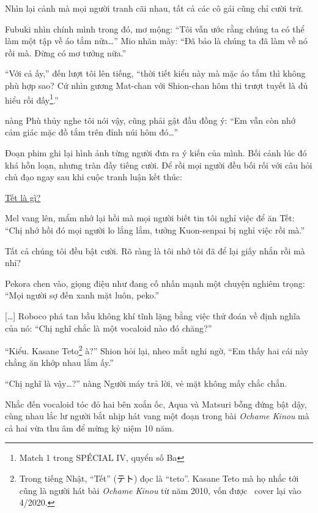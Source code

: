 \documentclass[../main.tex]{subfiles}
\begin{document}
\il

Nhìn lại cảnh mà mọi người tranh cãi nhau, tất cả các cô gái cũng chỉ cười trừ.

Fubuki nhìn chính mình trong đó, mơ mộng: ``Tôi vẫn ước rằng chúng ta có thể làm một tập về áo tắm nữa\dots'' Mio nhăn mày: ``Đã bảo là chúng ta đã làm về nó rồi mà. Đừng có mơ tưởng nữa.''

``Với cả ấy,'' đến lượt tôi lên tiếng, ``thời tiết kiểu này mà mặc áo tắm thì không phù hợp sao? Cứ nhìn gương Mat-chan với Shion-chan hôm thi trượt tuyết là đủ hiểu rồi đấy\footnote{{\sen Match 1} trong {\flaregothic SPÉCIAL IV}, quyển số Ba}.''

nàng Phù thủy nghe tôi nói vậy, cũng phải gật đầu đồng ý: ``Em vẫn còn nhớ cảm giác mặc đồ tắm trên đỉnh núi hôm đó\dots''

Đoạn phim ghi lại hình ảnh từng người đưa ra ý kiến của mình. Bối cảnh lúc đó khá hỗn loạn, nhưng tràn đầy tiếng cười. Để rồi mọi người đều bối rối với câu hỏi chủ đạo ngay sau khi cuộc tranh luận kết thúc:

\begin{center}
    \uline{Tết là gì?}
\end{center}

Mel vang lên, mẩm nhớ lại hồi mà mọi người biết tin tôi nghỉ việc để ăn Tết: ``Chị nhớ hồi đó mọi người lo lắng lắm, tưởng Kuon-senpai bị nghỉ việc rồi mà.''

Tất cả chúng tôi đều bật cười. Rõ ràng là tôi nhớ tôi đã để lại giấy nhắn rồi mà nhỉ?

Pekora chen vào, giọng điệu như đang cố nhấn mạnh một chuyện nghiêm trọng: ``Mọi người sợ đến xanh mặt luôn, peko.''

\il

[\dots] Roboco phá tan bầu không khí tĩnh lặng bằng việc thử đoán về định nghĩa của nó: ``Chị nghĩ chắc là một vocaloid nào đó chăng?''

``Kiểu. Kasane Teto\footnote{Trong tiếng Nhật, ``Tết'' (テト) đọc là ``teto''. Kasane Teto mà họ nhắc tới cũng là người hát bài \textit{Ochame Kinou} từ năm 2010, vốn được \hll\ cover lại vào 4/2020.} à?'' Shion hỏi lại, nheo mắt nghi ngờ, ``Em thấy hai cái này chẳng ăn khớp nhau lắm ấy.''

``Chị nghĩ là vậy\dots?'' nàng Người máy trả lời, vẻ mặt không mấy chắc chắn.

Nhắc đến vocaloid tóc đỏ hai bên xoắn ốc, Aqua và Matsuri bỗng đứng bật dậy, cùng nhau lắc lư người bắt nhịp hát vang một đoạn trong bài \textit{Ochame Kinou} mà cả hai vừa thu âm để mừng kỷ niệm 10 năm.
\end{document}

